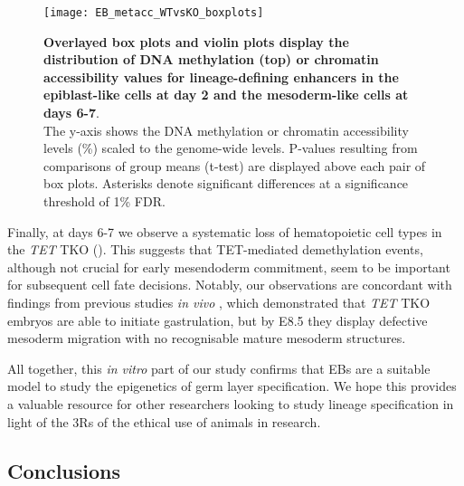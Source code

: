 \begin{figure}[H]
	\centering
	\texttt{[image: EB\_metacc\_WTvsKO\_boxplots]}
	\caption[]{
	\textbf{Overlayed box plots and violin plots display the distribution of DNA methylation (top) or chromatin accessibility values for lineage-defining enhancers in the epiblast-like cells at day 2 and the mesoderm-like cells at days 6-7}.\\
	The y-axis shows the DNA methylation  or chromatin accessibility levels (\%) scaled to the genome-wide levels. P-values resulting from comparisons of group means (t-test) are displayed above each pair of box plots. Asterisks denote significant differences at a significance threshold of 1\% FDR.
	}
	\label{fig:EB_metacc_WTvsKO_boxplots}
\end{figure}

Finally, at days 6-7 we observe a systematic loss of hematopoietic cell types in the \textit{TET} TKO (). This suggests that TET-mediated demethylation events, although not crucial for early mesendoderm commitment, seem to be important for subsequent cell fate decisions. Notably, our observations are concordant with findings from previous studies \textit{in vivo} \cite{Dai2016}, which demonstrated that \textit{TET} TKO embryos are able to initiate
gastrulation, but by E8.5 they display defective mesoderm migration with no recognisable mature mesoderm structures.

All together, this \textit{in vitro} part of our study confirms that EBs are a suitable model to study the epigenetics of germ layer specification. We hope this provides a valuable resource for other researchers looking to study lineage specification in light of the 3Rs of the ethical use of animals in research.


\subsection{Conclusions}

